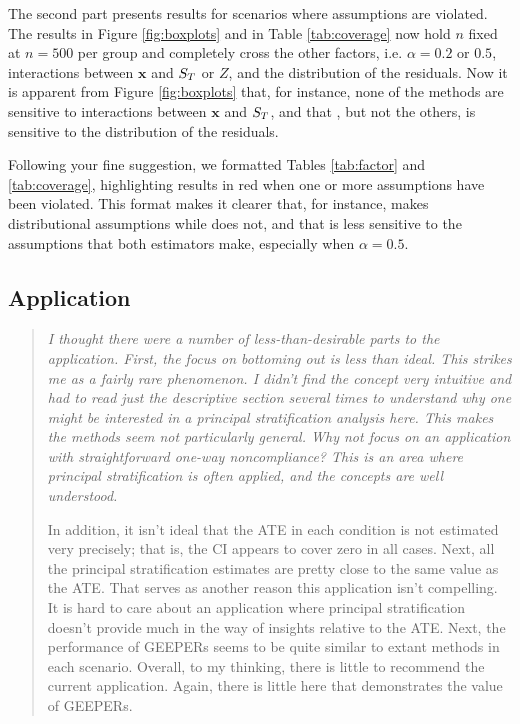\documentclass[]{article}
\newenvironment{itquote}
  {\begin{quote} \itshape}
  {\end{quote}\ignorespacesafterend}
\begin{document}
The second part presents results for scenarios where assumptions are violated. 
The results in Figure \ref{fig:boxplots} and in Table \ref{tab:coverage} now hold $n$ fixed at $n=500$ per group and completely cross the other factors, i.e. $\alpha=0.2$ or $0.5$, interactions between $\bm{x}$ and $S_T$ or $Z$, and the distribution of the residuals.
Now it is apparent from Figure \ref{fig:boxplots} that, for instance, none of the methods are sensitive to interactions between $\bm{x}$ and $S_T$, and that \pmm, but not the others, is sensitive to the distribution of the residuals.  

Following your fine suggestion, we formatted Tables \ref{tab:factor} and \ref{tab:coverage}, highlighting results in red when one or more assumptions have been violated.
This format makes it clearer that, for instance, \pmm makes distributional assumptions while \geepers does not, and that \geepers is less sensitive to the assumptions that both estimators make, especially when $\alpha=0.5$. 


\subsection{Application}
\begin{itquote}
I thought there were a number of less-than-desirable parts to the application. First, the focus on bottoming out is less than ideal. This strikes me as a fairly rare phenomenon. I didn't find the concept very intuitive and had to read just the descriptive section several times to understand why one might be interested in a principal stratification analysis here.  This makes the methods seem not particularly general.  Why not focus on an application with straightforward one-way noncompliance? This is an area where principal stratification is often applied, and the concepts are well understood.

In addition, it isn't ideal that the ATE in each condition is not estimated very precisely; that is, the CI appears to cover zero in all cases. Next, all the principal stratification estimates are pretty close to the same value as the ATE. That serves as another reason this application isn't compelling. It is hard to care about an application where principal stratification doesn't provide much in the way of insights relative to the ATE. Next, the performance of GEEPERs seems to be quite similar to extant methods in each scenario. Overall, to my thinking, there is little to recommend the current application. Again, there is little here that demonstrates the value of GEEPERs.
\end{itquote}
\end{document}
